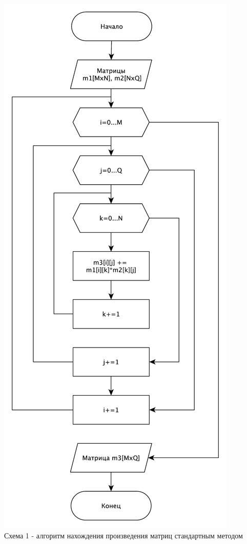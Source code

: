 \documentclass[a4paper,14pt]{article} %
\begin{document}
        \begin{center}
        		\includegraphics[scale = 0.65]{shema1} \\ Схема  1 - алгоритм нахождения произведения матриц стандартным методом
	\end{center}
	
\end{document}
